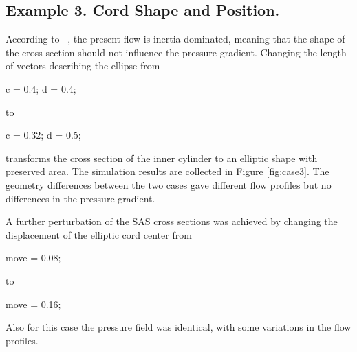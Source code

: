 \subsection{Example 3. Cord Shape and Position.}

According to ~\cite{Loth2001,Alperin2006}, the present flow is inertia dominated, meaning that the shape of the cross section should not influence the pressure gradient. Changing the length of vectors describing the ellipse from
\begin{code}
c = 0.4;
d = 0.4;
\end{code}
to
\begin{code}
c = 0.32;
d = 0.5;
\end{code}
transforms the cross section of the inner cylinder to an elliptic shape with preserved area. The simulation results are collected in Figure \ref{fig:case3}. The geometry differences between the two cases gave different flow profiles but no differences in the pressure gradient.


A further perturbation of the SAS cross sections was achieved by changing the displacement of the elliptic cord center from
\begin{code}
move = 0.08;
\end{code}
to
\begin{code}
move = 0.16;
\end{code}
Also for this case the pressure field was identical, with some variations in the flow profiles.



